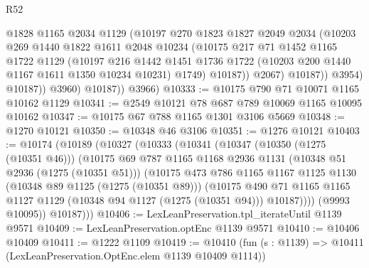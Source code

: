 \begin{lexlean}{R52}
\begin{coremodule}
                      @1828
                      @1165
                      @2034
                      @1129
                      (@10197
                        @270
                        @1823
                        @1827
                        @2049
                        @2034
                        (@10203
                          @269
                          @1440
                          @1822
                          @1611
                          @2048
                          @10234
                          (@10175
                            @217
                            @71
                            @1452
                            @1165
                            @1722
                            @1129
                            (@10197
                              @216
                              @1442
                              @1451
                              @1736
                              @1722
                              (@10203 @200 @1440 @1167 @1611 @1350 @10234 @10231)
                              @1749)
                            @10187))
                        @2067)
                      @10187))
                  @3954)
                @10187))
            @3960)
          @10187))
      @3966)
@10333 := @10175 @790 @71 @10071 @1165 @10162 @1129
@10341 := @2549 @10121 @78 @687 @789 @10069 @1165 @10095 @10162
@10347 := @10175 @67 @788 @1165 @1301 @3106 @5669
@10348 := @1270 @10121
@10350 := @10348 @46 @3106
@10351 := @1276 @10121
@10403 := @10174
    (@10189
      (@10327
        (@10333
          (@10341
            (@10347
              (@10350 (@1275 (@10351 @46)))
              (@10175
                @69
                @787
                @1165
                @1168
                @2936
                @1131
                (@10348 @51 @2936 (@1275 (@10351 @51)))
                (@10175
                  @473
                  @786
                  @1165
                  @1167
                  @1125
                  @1130
                  (@10348 @89 @1125 (@1275 (@10351 @89)))
                  (@10175
                    @490
                    @71
                    @1165
                    @1165
                    @1127
                    @1129
                    (@10348 @94 @1127 (@1275 (@10351 @94)))
                    @10187))))
            (@9993 @10095))
          @10187)))
@10406 := LexLeanPreservation.tpl_iterateUntil @1139 @9571
@10409 := LexLeanPreservation.optEnc @1139 @9571
@10410 := @10406 @10409
@10411 := @1222 @1109
@10419 := @10410
    (fun (s : @1139) => @10411 (LexLeanPreservation.OptEnc.elem @1139 @10409 @1114))

\end{coremodule}
\end{lexlean}
